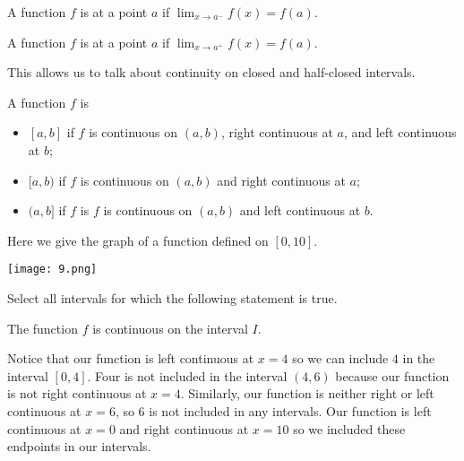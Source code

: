\documentclass{ximera}
\begin{document}
\begin{definition}
  A function $f$ is  at a point $a$ if
  $\lim_{x\to a^-} f(x) = f(a)$.

  A function $f$ is  at a point $a$ if
  $\lim_{x\to a^+} f(x) = f(a)$.
\end{definition}

 This allows us to talk about continuity on closed and half-closed intervals.


\begin{definition}
  A function $f$ is
  \begin{itemize}
    \item {} $[a,b]$ if $f$ is
      continuous on $(a,b)$, right continuous at $a$, and left
      continuous at $b$;
    \item {} $[a,b)$ if $f$ is
      continuous on $(a,b)$ and right continuous at $a$;
    \item {} $(a,b]$ if $f$ is
      $f$ is continuous on $(a,b)$ and left continuous at $b$.
  \end{itemize}
\end{definition}



\begin{question}
Here we give the graph of a function defined on $[0,10]$.
\begin{image}
  \texttt{[image: 9.png]}
\end{image}
Select all intervals for which the following statement is true.

The function $f$ is continuous on the interval $I$.
\begin{selectAll}
 \choice{$I=[4,6)$}
  \choice{$I= (4,6]$}
  \choice[correct]{$I=(6,10]$}
 \choice{$I=[6,10)$}
\end{selectAll}
\begin{feedback}
Notice that our function is left continuous at $x=4$ so we can include
$4$ in the interval $[0,4]$. Four is not included in the interval
$(4,6)$ because our function is not right continuous at $x=4$.
Similarly, our function is neither right or left continuous at $x=6$,
so $6$ is not included in any intervals.  Our function is left
continuous at $x=0$ and right continuous at $x=10$ so we included
these endpoints in our intervals.
\end{feedback}
\end{question}
\end{document}
